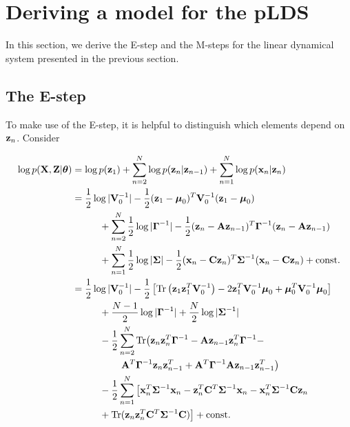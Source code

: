 \documentclass[11pt]{article}
\numberwithin{equation}{section}
\newcommand{\x}{{\bf x}}
\newcommand{\z}{{\bf z}}
\begin{document}

\section{Deriving a model for the pLDS}
In this section, we derive the E-step and the M-steps for the linear dynamical system presented in the previous section.

\subsection{The E-step} \label{subsec:e-step}
To make use of the E-step, it is helpful to distinguish which elements depend on $\z_n$. Consider

\begin{align}
	\log p({\bf X}, {\bf Z}\vert \boldsymbol\theta) &= \log p(\z_1) + \sum_{n=2}^N \log p(\z_n\vert \z_{n-1}) + \sum_{n=1}^N \log p(\x_n\vert \z_n)\\
	   &=\frac{1}{2}\log\vert{\bf V}_0^{-1}\vert - \frac{1}{2}(\z_1 - \boldsymbol\mu_0)^T{\bf V}_0^{-1}(\z_1 - \boldsymbol\mu_0) \nonumber \\
	   &\hspace{1cm}+ \sum_{n=2}^N \frac{1}{2}\log\vert\boldsymbol\Gamma^{-1}\vert - \frac{1}{2}(\z_n - {\bf A z}_{n-1})^T\boldsymbol{\Gamma}^{-1}(\z_n - {\bf A z}_{n-1}) \nonumber \\
	   &\hspace{1cm}+\sum_{n=1}^N \frac{1}{2}\log\vert\boldsymbol\Sigma\vert -\frac{1}{2}(\x_n - {\bf C z}_n)^T \boldsymbol{\Sigma}^{-1}(\x_n - {\bf C z}_n) + \text{const.}\\
	   &= \frac{1}{2}\log \vert
	  {\bf V}_0^{-1}\vert -\frac{1}{2}\left[\text{Tr}\left(\z_1 \z_1^T {\bf V}_0^{-1}\right) -2 \z_1^T{\bf V}_0^{-1}\boldsymbol\mu_0 + \boldsymbol\mu_0^T {\bf V}_0^{-1}\boldsymbol\mu_0\right] \nonumber \\
	  &\hspace{1cm}+ \frac{N-1}{2}\log\vert\boldsymbol\Gamma^{-1}\vert + \frac{N}{2}\log\vert \boldsymbol\Sigma^{-1}\vert \nonumber \\
	  &\hspace{1cm}-\frac{1}{2} \sum_{n=2}^{N}\text{Tr}\big(\z_n\z_n^T\boldsymbol\Gamma^{-1} -{\bf A} \z_{n-1}\z_n^T\boldsymbol\Gamma^{-1} - \nonumber\\
	  &\hspace{1.8cm}{\bf A}^T\boldsymbol{\Gamma}^{-1}\z_n\z_{n-1}^T + {\bf A}^T \boldsymbol\Gamma^{-1}{\bf A}\z_{n-1}\z_{n-1}^T\big) \nonumber\\
	  &\hspace{1cm}-\frac{1}{2}\sum_{n=1}^N\big[\x_n^T\boldsymbol{\Sigma}^{-1}\x_n - \z_n^T{\bf C}^T\boldsymbol\Sigma^{-1}\x_n - \x_n^T\boldsymbol{\Sigma}^{-1}{\bf C}\z_n  \\
	  &\hspace{1cm} + \text{Tr}(\z_n\z_n^T{\bf C}^T\boldsymbol\Sigma^{-1}{\bf C})\big] + \text{const.} \label{eq:complete-log-likelihood}
\end{align}
\end{document}
